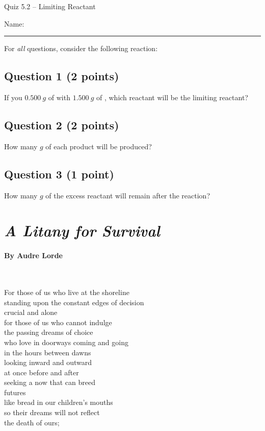 \documentclass[11pt, letterpaper]{memoir}
\begin{document}
	\begin{center}
		{\large	Quiz 5.2 -- Limiting Reactant}
	\end{center}
{\large Name: \rule[-1mm]{4in}{.1pt}
	
	\noindent
	For \emph{all} questions, consider the following reaction: 
	
	\subsection*{Question 1 (2 points)}
	If you $0.500~g$ of  with $1.500~g$ of , which reactant will be the limiting reactant?
	
	\vspace{13em}
	\subsection*{Question 2 (2 points)}
	How many $g$ of each product will be produced?
	
	\vspace{13em}
	\subsection*{Question 3 (1 point)} 
	How many $g$ of the excess reactant will remain after the reaction?
\newpage
\pagestyle{empty}
\addtocounter{page}{-1}
\section*{\emph{A Litany for Survival}}
\paragraph{By Audre Lorde}~

\vspace{1em}\noindent
\begin{minipage}[t]{0.56\linewidth}
	For those of us who live at the shoreline\\
	standing upon the constant edges of decision\\
	crucial and alone\\
	for those of us who cannot indulge\\
	the passing dreams of choice\\
	who love in doorways coming and going\\
	in the hours between dawns\\
	looking inward and outward\\
	at once before and after\\
	seeking a now that can breed\\
	futures\\
	like bread in our children’s mouths\\
	so their dreams will not reflect\\
	the death of ours;


\end{minipage}}
\end{document}
